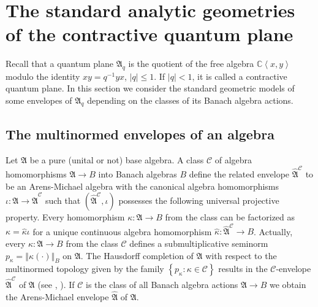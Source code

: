 \documentclass[12pt]{amsart}%
\theoremstyle{plain}
\numberwithin{equation}{section}
\numberwithin{equation}{section}
\numberwithin{theorem}{section}
\numberwithin{lemma}{section}
\numberwithin{remark}{section}
\numberwithin{example}{section}
\numberwithin{proposition}{section}
\numberwithin{definition}{section}
\numberwithin{corollary}{section}
\begin{document}
\section{The standard analytic geometries of the contractive quantum
plane\label{sectionCQP}}

Recall that a quantum plane $\mathfrak{A}_{q}$ is the quotient of the free
algebra $\mathbb{C}\left\langle x,y\right\rangle $ modulo the identity
$xy=q^{-1}yx$, $\left\vert q\right\vert \leq1$. If $\left\vert q\right\vert
<1$, it is called a contractive quantum plane. In this section we consider the
standard geometric models of some envelopes of $\mathfrak{A}_{q}$ depending on
the classes of its Banach algebra actions.

\subsection{The multinormed envelopes of an algebra\label{subsecMEQ}}

Let $\mathfrak{A}$ be a pure (unital or not) base algebra. A class
$\mathcal{C}$ of algebra homomorphisms $\mathfrak{A}\rightarrow B$ into Banach
algebras $B$ define the related envelope $\widehat{\mathfrak{A}}^{\mathcal{C}%
}$ to be an Arens-Michael algebra with the canonical algebra homomorphisms
$\iota:\mathfrak{A}\rightarrow\widehat{\mathfrak{A}}^{\mathcal{C}}$ such that
$\left(  \widehat{\mathfrak{A}}^{\mathcal{C}},\iota\right)  $ possesses the
following universal projective property. Every homomorphism $\kappa
:\mathfrak{A}\rightarrow B$ from the class can be factorized as $\kappa
=\widehat{\kappa}\iota$ for a unique continuous algebra homomorphism
$\widehat{\kappa}:\widehat{\mathfrak{A}}^{\mathcal{C}}\rightarrow B$.
Actually, every $\kappa:\mathfrak{A}\rightarrow B$ from the class
$\mathcal{C}$ defines a submultiplicative seminorm $p_{\kappa}=\left\Vert
\kappa\left(  \cdot\right)  \right\Vert _{B}$ on $\mathfrak{A}$. The Hausdorff
completion of $\mathfrak{A}$ with respect to the multinormed topology given by
the family $\left\{  p_{\kappa}:\kappa\in\mathcal{C}\right\}  $ results in the
$\mathcal{C}$-envelope $\widehat{\mathfrak{A}}^{\mathcal{C}}$ of
$\mathfrak{A}$ (see \cite{Aris}, \cite{DosiSS}). If $\mathcal{C}$ is the class
of all Banach algebra actions $\mathfrak{A}\rightarrow B$ we obtain the
Arens-Michael envelope $\widehat{\mathfrak{A}}$ of $\mathfrak{A}$.
\end{document}

